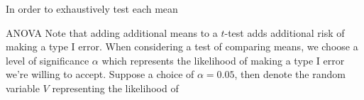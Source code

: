 \begin{frame}
\vspace{2mm}
In order to exhaustively test each mean
\end{frame}

\begin{frame}{ANOVA}
Note that adding additional means to a $t$-test adds additional risk of making a type I error. When considering a test of comparing means, we choose a level of significance $\alpha$ which represents the likelihood of making a type I error we're willing to accept. Suppose a choice of $\alpha=0.05$, then denote the random variable $V$ representing the likelihood of 

\end{frame}

